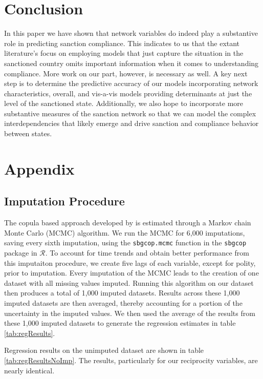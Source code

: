 \section*{Conclusion}
\label{conclusion}

In this paper we have shown that network variables do indeed play a substantive role in predicting sanction compliance. This indicates to us that the extant literature's focus on employing models that just capture the situation in the sanctioned country omits important information when it comes to understanding compliance. More work on our part, however, is necessary as well. A key next step is to determine the predictive accuracy of our models incorporating network characteristics, overall, and vis-a-vis models providing determinants at just the level of the sanctioned state. Additionally, we also hope to incorporate more substantive measures of the sanction network so that we can model the complex interdependencies that likely emerge and drive sanction and compliance behavior between states. 


\newpage
\section*{Appendix}
\label{appendix}

\subsection*{Imputation Procedure}

The copula based approach developed by \citet{hoff:2007} is estimated through a Markov chain Monte Carlo (MCMC) algorithm. We run the MCMC for 6,000 imputations, saving every sixth imputation, using the \texttt{sbgcop.mcmc} function in the \texttt{sbgcop} package in $\mathcal{R}$. To account for time trends and obtain better performance from this imputaiton procedure, we create five lags of each variable, except for polity, prior to imputation. Every imputation of the MCMC leads to the creation of one dataset with all missing values imputed. Running this algorithm on our dataset then produces a total of 1,000 imputed datasets. Results across these 1,000 imputed datasets are then averaged, thereby accounting for a portion of the uncertainty in the imputed values. We then used the average of the results from these 1,000 imputed datasets to generate the regression estimates in table \ref{tab:regResults}. 

Regression results on the unimputed dataset are shown in table \ref{tab:regResultsNoImp}. The results, particularly for our reciprocity variables, are nearly identical. 


\FloatBarrier